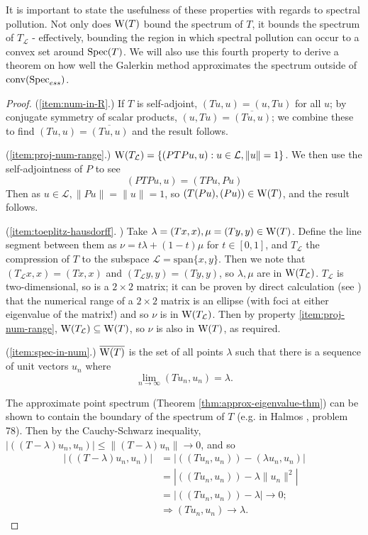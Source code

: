 \documentclass[../main.tex]{subfiles}
\begin{document}
It is important to state the usefulness of these properties with regards to spectral pollution. Not only does $\mathrm{W}(T)$ bound the spectrum of $T$,
it bounds the spectrum of $T_\mathcal{L}$ - effectively, bounding the region in which spectral pollution can occur to a convex set around $\mathrm{Spec}(T)$.
We will also use this fourth property to derive a theorem on how well the Galerkin method approximates the spectrum outside of $\mathrm{conv}(\mathrm{Spec}_{ess})$.

\begin{proof}
(\ref{item:num-in-R}.) If $T$ is self-adjoint, $(Tu, u) = (u, Tu)$ for all $u$; by conjugate symmetry of scalar products, $(u, Tu) = \overline{(Tu, u)}$; we combine these to find $(Tu, u) = \overline{(Tu, u)}$ and the result follows. 

(\ref{item:proj-num-range}.) $\mathrm{W}(T_\mathcal{L}) = \{( PTPu, u ) : u \in \mathcal{L}, \|u\|=1\}$.
We then use the self-adjointness of $P$ to see
$$( PTPu, u ) = ( TPu, Pu )$$
Then as $u \in \mathcal{L}, \|Pu\| = \|u\| = 1$,
so $( T(Pu), (Pu) ) \in \mathrm{W}(T)$, and the result follows.

(\ref{item:toeplitz-hausdorff}. \cite{gustafson1997numerical}) Take $\lambda = (Tx, x), \mu = (Ty, y) \in \mathrm{W}(T)$. Define the line segment between them as 
$\nu = t\lambda + (1-t)\mu$ for $t \in [0, 1]$, and $T_\mathcal{L}$ the compression of $T$ to the subspace 
$\mathcal{L} = \text{span}\{x, y\}$. Then we note that $(T_\mathcal{L} x, x) = (Tx, x)$ and $(T_\mathcal{L} y, y) = (Ty, y)$, so $\lambda, \mu$ are in
$\mathrm{W}(T_\mathcal{L})$. $T_\mathcal{L}$ is two-dimensional, so is a $2 \times 2$ matrix; it can be proven by direct calculation (see \cite{gustafson1997numerical}) that the numerical range of a $2 \times 2$ matrix is an ellipse (with foci at either eigenvalue of the matrix!) and so $\nu$ is in $\mathrm{W}(T_\mathcal{L})$.
Then by property \ref{item:proj-num-range}, $\mathrm{W}(T_\mathcal{L}) \subseteq \mathrm{W}(T)$, so $\nu$ is also in $\mathrm{W}(T)$, as required.

(\ref{item:spec-in-num}.) $\overline{\mathrm{W}(T)}$ is the set of all points $\lambda$ such that there is a sequence of unit vectors $u_n$ where
$$\lim_{n\rightarrow \infty}( Tu_n, u_n ) = \lambda.$$

The approximate point spectrum (Theorem \ref{thm:approx-eigenvalue-thm}) can be shown to contain the boundary of the spectrum of $T$ (e.g. in Halmos \cite{halmos1982hilbert}, problem 78). Then by the Cauchy-Schwarz inequality,
$|( (T - \lambda)u_n, u_n )| \leq \|(T - \lambda)u_n\| \rightarrow 0$, and so
\begin{equation*}
\begin{split}
|( (T - \lambda)u_n, u_n )| &  = |( (Tu_n, u_n) ) - ( \lambda u_n, u_n )| \\
& = |( (Tu_n, u_n) ) - \lambda \|u_n\|^2| \\
& = |( (Tu_n, u_n) ) - \lambda| \rightarrow 0; \\
& \Rightarrow ( Tu_n, u_n ) \rightarrow \lambda.
\end{split}
\end{equation*}


\end{proof}
\end{document}
